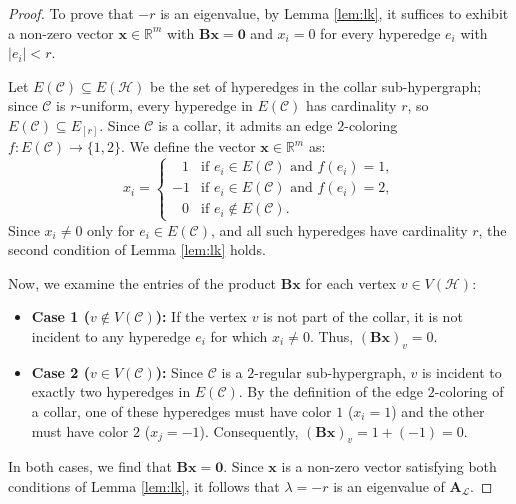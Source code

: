 \documentclass[10pt,a4paper]{amsart}
\begin{document}
\begin{proof}
To prove that $-r$ is an eigenvalue, by Lemma \ref{lem:lk}, it suffices to exhibit a non-zero vector $\mathbf{x} \in \mathbb{R}^{m}$ with $\mathbf{B}\mathbf{x} = \mathbf{0}$ and $x_i = 0$ for every hyperedge $e_i$ with $|e_i| < r$.

Let $E(\mathcal{C}) \subseteq E(\mathcal{H})$ be the set of hyperedges in the collar sub-hypergraph; since $\mathcal{C}$ is $r$-uniform, every hyperedge in $E(\mathcal{C})$ has cardinality $r$, so $E(\mathcal{C}) \subseteq E_{[r]}$. Since $\mathcal{C}$ is a collar, it admits an edge $2$-coloring $f: E(\mathcal{C}) \to \{1, 2\}$. We define the vector $\mathbf{x} \in \mathbb{R}^m$ as:
$$x_i = \begin{cases} 
\;\;\,1 & \text{if } e_i \in E(\mathcal{C}) \text{ and } f(e_i) = 1, \\ 
-1 & \text{if } e_i \in E(\mathcal{C}) \text{ and } f(e_i) = 2, \\
\;\;\,0 & \text{if } e_i \notin E(\mathcal{C}).
\end{cases}$$
Since $x_i \neq 0$ only for $e_i \in E(\mathcal{C})$, and all such hyperedges have cardinality $r$, the second condition of Lemma \ref{lem:lk} holds.

Now, we examine the entries of the product $\mathbf{B}\mathbf{x}$ for each vertex $v \in V(\mathcal{H})$:
\begin{itemize}
\item \textbf{Case 1 ($v \notin V(\mathcal{C})$):} If the vertex $v$ is not part of the collar, it is not incident to any hyperedge $e_i$ for which $x_i \neq 0$. Thus, $(\mathbf{B}\mathbf{x})_v = 0$.
\item \textbf{Case 2 ($v \in V(\mathcal{C})$):} Since $\mathcal{C}$ is a $2$-regular sub-hypergraph, $v$ is incident to exactly two hyperedges in $E(\mathcal{C})$. By the definition of the edge $2$-coloring of a collar, one of these hyperedges must have color $1$ ($x_i = 1$) and the other must have color $2$ ($x_j = -1$). Consequently, $(\mathbf{B}\mathbf{x})_v = 1 + (-1) = 0.$
\end{itemize}
In both cases, we find that $\mathbf{B}\mathbf{x} = \mathbf{0}$. Since $\mathbf{x}$ is a non-zero vector satisfying both conditions of Lemma \ref{lem:lk}, it follows that $\lambda = -r$ is an eigenvalue of $\mathbf{A}_{\mathcal{L}}$.
\end{proof}
\end{document}
